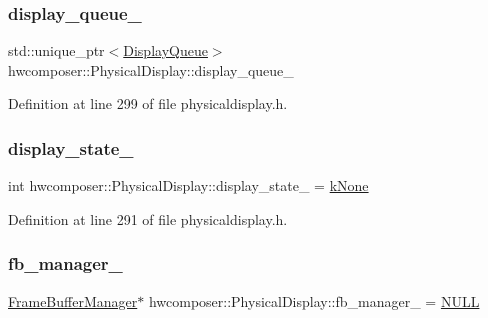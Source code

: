 \subsubsection{\texorpdfstring{display\+\_\+queue\+\_\+}{display\_queue\_}}
{\footnotesize\ttfamily std\+::unique\+\_\+ptr$<$\mbox{\hyperlink{classhwcomposer_1_1DisplayQueue}{Display\+Queue}}$>$ hwcomposer\+::\+Physical\+Display\+::display\+\_\+queue\+\_\+\hspace{0.3cm}{\ttfamily [protected]}}



Definition at line 299 of file physicaldisplay.\+h.

\mbox{\label{classhwcomposer_1_1PhysicalDisplay_aa0a736c951942f62a8c9514548dbfa0b}} 
\subsubsection{\texorpdfstring{display\+\_\+state\+\_\+}{display\_state\_}}
{\footnotesize\ttfamily int hwcomposer\+::\+Physical\+Display\+::display\+\_\+state\+\_\+ = \mbox{\hyperlink{classhwcomposer_1_1PhysicalDisplay_ae390ba5a8a0970767736459801b5d5fba926d32deff70954c6d218ea554e4b49b}{k\+None}}\hspace{0.3cm}{\ttfamily [protected]}}



Definition at line 291 of file physicaldisplay.\+h.

\mbox{\label{classhwcomposer_1_1PhysicalDisplay_afd057257acfb8801ece8f51d9d7a7abe}} 
\subsubsection{\texorpdfstring{fb\+\_\+manager\+\_\+}{fb\_manager\_}}
{\footnotesize\ttfamily \mbox{\hyperlink{classhwcomposer_1_1FrameBufferManager}{Frame\+Buffer\+Manager}}$\ast$ hwcomposer\+::\+Physical\+Display\+::fb\+\_\+manager\+\_\+ = \mbox{\hyperlink{alios_2platformdefines_8h_a070d2ce7b6bb7e5c05602aa8c308d0c4}{N\+U\+LL}}\hspace{0.3cm}{\ttfamily [protected]}}




